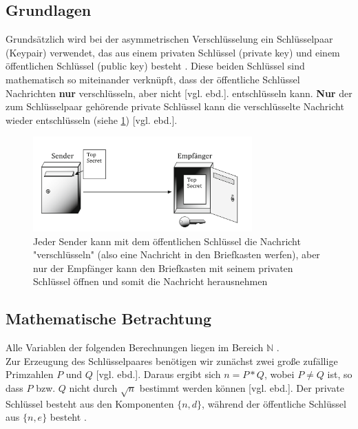 \documentclass[a4paper,ngerman, headheight=28pt,12pt]{scrartcl}
\newcommand{\vcite}[1]{\cite[vgl.][]{#1}}
\newcommand{\vebd}{[vgl. ebd.]}
\begin{document}
\subsection{Grundlagen}
Grundsätzlich wird bei der asymmetrischen Verschlüsselung ein Schlüsselpaar (Keypair) verwendet, das aus einem privaten Schlüssel (private key) und einem öffentlichen Schlüssel (public key) besteht \vcite{Rsa-Basics}. Diese beiden Schlüssel sind mathematisch so miteinander verknüpft, dass der öffentliche Schlüssel Nachrichten \textbf{nur} verschlüsseln, aber nicht \vebd. entschlüsseln kann. \textbf{Nur} der zum Schlüsselpaar gehörende private Schlüssel kann die verschlüsselte Nachricht wieder entschlüsseln (siehe \cref{fig:E2EE}) \vebd.
\begin{figure}[ht]
  \centering
  \includegraphics[width=0.75\textwidth]{Briefkasten-asymm.png}
  \caption{Jeder Sender kann mit dem öffentlichen Schlüssel die Nachricht "verschlüsseln" (also eine Nachricht in den Briefkasten werfen), aber nur der Empfänger kann den Briefkasten mit seinem privaten Schlüssel öffnen und somit die Nachricht herausnehmen\vcite{fig:Rsa-Cryptography} \label{fig:E2EE}}
\end{figure}

\subsection{Mathematische Betrachtung}
Alle Variablen der folgenden Berechnungen liegen im Bereich $\mathbb{N}$ \vcite{RsaGenCond}. \\
Zur Erzeugung des Schlüsselpaares benötigen wir zunächst zwei große zufällige Primzahlen $P$ und $Q$ \vebd. Daraus ergibt sich $n = P * Q$, wobei $P \neq Q$ ist, so dass $P$ bzw. $Q$ nicht durch $\sqrt{n}$ bestimmt werden können \vebd. Der private Schlüssel besteht aus den Komponenten $\{ n, d \}$, während der öffentliche Schlüssel aus $\{ n, e \}$ besteht \vcite{RsaVariables}.
\end{document}
